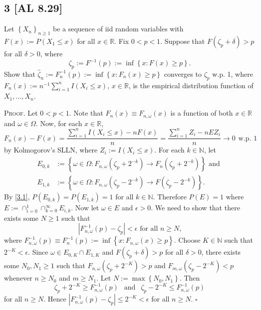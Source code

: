 \documentclass[12pt]{article}
\newcounter{ProofCounter}
\newenvironment{Proof}{\stepcounter{ProofCounter}\textsc{Proof.}}{\hfill$\square$}
\begin{document}
\subsection*{3 [AL 8.29]}
\begin{tcolorbox}
Let $\left\{ X_{n} \right\}_{n\geq 1}$ be a sequence of iid random variables with $F(x) := P(X_{1} \leq x)$ for all $x \in \mathbb{R}$. Fix $0 < p <
1$. Suppose that $F(\zeta_{p} + \delta) > p$ for all $\delta> 0$, where 
\[ \zeta_p := F^{-1}(p) := \inf\left\{ x : F(x) \geq p \right\}. \]
Show that $\hat{\zeta}_{n} := F_{n}^{-1}(p) := \inf\left\{ x : F_{n}(x) \geq p \right\}$ converges to $\zeta_{p}$ w.p. 1, where $F_{n}(x) :=
n^{-1}\sum_{i=1}^{n}I(X_{i} \leq x)$, $x \in \mathbb{R}$, is the empirical distribution function of $X_{1}, \hdots, X_{n}$.
\end{tcolorbox}
\begin{Proof}
Let $0 < p < 1$. Note that $F_{n}(x) \equiv F_{n,\omega}(x)$ is a function of both $x \in \mathbb{R}$ and $\omega \in \Omega$. Now, for each $x \in
\mathbb{R}$,
\begin{equation}
F_{n}(x) - F(x) = \frac{\sum_{i=1}^{n}I(X_{i} \leq x) - nF(x)}{n} = \frac{\sum_{i=1}^{n}Z_{i} - nEZ_{i}}{n} \rightarrow 0 \ \ \text{w.p. 1} 
\label{3.1}
\end{equation}
by Kolmogorov's SLLN, where $Z_{i} := I(X_{i} \leq x)$. For each $k \in \mathbb{N}$, let 
\begin{align*}
E_{0,k} & := \left\{ \omega \in \Omega : F_{n,\omega}(\zeta_{p} + 2^{-k}) \rightarrow F_{n}(\zeta_{p} + 2^{-k}) \right\} \text{ and } \\
E_{1,k} & := \left\{ \omega \in \Omega : F_{n,\omega}(\zeta_{p} - 2^{-k}) \rightarrow F(\zeta_{p}-2^{-k})\right\}.
\end{align*}
By \eqref{3.1}, $P(E_{0,k}) = P(E_{1,k}) = 1$ for all $k \in \mathbb{N}$. Therefore $P(E) = 1$ where $E := \cap_{i=0}^{1}\cap_{k=0}^{\infty}E_{i,k}$.
Now let $\omega \in E$ and $\epsilon > 0$. We need to show that there exists some $N \geq 1$ such that 
\[ |F_{n,\omega}^{-1}(p) - \zeta_p| < \epsilon \text{ for all $n \geq N$,} \]
where $F_{n,\omega}^{-1}(p) \equiv F_{n}^{-1}(p) := \inf\left\{ x : F_{n,\omega}(x) \geq p \right\}$.
Choose $K \in \mathbb{N}$ such that $2^{-K} < \epsilon$. Since $\omega \in E_{0,K}\cap E_{1,K}$ and $F(\zeta_{p} + \delta) > p$ for all $\delta
> 0$, there exists some $N_{0}, N_{1} \geq 1$ such that 
$F_{n,\omega}(\zeta_{p} + 2^{-K}) > p$ and $F_{m,\omega}(\zeta_p - 2^{-K}) < p$ whenever $n \geq N_{0}$ and $m \geq N_{1}$. Let $N := \max\left\{
N_{0}, N_{1} \right\}$.
Then 
\[ \zeta_p + 2^{-K} \geq F_{n,\omega}^{-1}(p)\  \ \text{ and }\ \ \zeta_p - 2^{-K} \leq F_{n,\omega}^{-1}(p) \] 
for all $n \geq N$. Hence $|F_{n,\omega}^{-1}(p) - \zeta_p| \leq 2^{-K} < \epsilon$ for all $n \geq N$.
\end{Proof}
\end{document}
